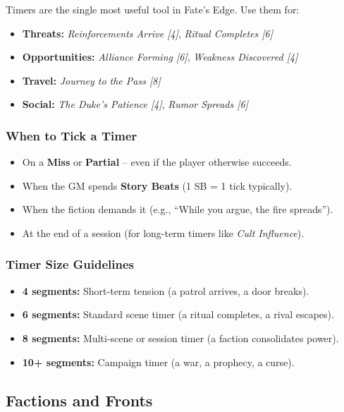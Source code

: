 Timers are the single most useful tool in Fate's Edge. Use them for:
\begin{itemize}
  \item \textbf{Threats:} \emph{Reinforcements Arrive [4]}, \emph{Ritual Completes [6]}
  \item \textbf{Opportunities:} \emph{Alliance Forming [6]}, \emph{Weakness Discovered [4]}
  \item \textbf{Travel:} \emph{Journey to the Pass [8]}
  \item \textbf{Social:} \emph{The Duke's Patience [4]}, \emph{Rumor Spreads [6]}
\end{itemize}

\subsubsection{When to Tick a Timer}
\begin{itemize}
  \item On a \textbf{Miss} or \textbf{Partial} -- even if the player otherwise succeeds.
  \item When the GM spends \textbf{Story Beats} (1 SB = 1 tick typically).
  \item When the fiction demands it (e.g., ``While you argue, the fire spreads'').
  \item At the end of a session (for long-term timers like \emph{Cult Influence}).
\end{itemize}

\subsubsection{Timer Size Guidelines}
\begin{itemize}
  \item \textbf{4 segments:} Short-term tension (a patrol arrives, a door breaks).
  \item \textbf{6 segments:} Standard scene timer (a ritual completes, a rival escapes).
  \item \textbf{8 segments:} Multi-scene or session timer (a faction consolidates power).
  \item \textbf{10+ segments:} Campaign timer (a war, a prophecy, a curse).
\end{itemize}

\subsection{Factions and Fronts}


